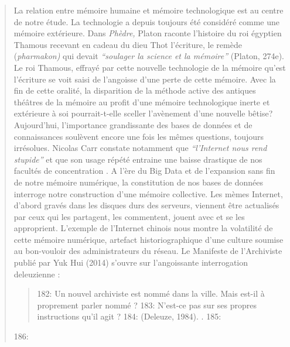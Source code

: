 \begin{quote}
La relation entre m\'emoire humaine et m\'emoire technologique est au centre de notre \'etude. La technologie a depuis toujours \'et\'e consid\'er\'e comme une m\'emoire ext\'erieure. Dans \textit{Ph\`edre, }Platon raconte l{\textquoteright}histoire du roi \'egyptien Thamous recevant en cadeau du dieu Thot l{\textquoteright}\'ecriture, le rem\`ede (\textit{pharmakon) }qui devait \textit{{\textquotedblleft}soulager la science et la m\'emoire{\textquotedblright} }(Platon, 274e). Le roi Thamous, effray\'e par cette nouvelle technologie de la m\'emoire qu{\textquoteright}est l{\textquoteright}\'ecriture se voit saisi de l{\textquoteright}angoisse d{\textquoteright}une perte de cette m\'emoire. Avec la fin de cette oralit\'e, la disparition de la m\'ethode active des antiques th\'e\^atres de la m\'emoire au profit d{\textquoteright}une m\'emoire technologique inerte et ext\'erieure \`a soi pourrait-t-elle sceller l{\textquoteright}av\`enement d{\textquoteright}une nouvelle b\^etise? Aujourd{\textquoteright}hui, l{\textquoteright}importance grandissante des bases de donn\'ees et de connaissances soul\`event encore une fois les m\^emes questions, toujours irr\'esolues. Nicolas Carr constate notamment que \textit{{\textquotedblleft}l{\textquoteright}Internet nous rend stupide{\textquotedblright}} et que son usage r\'ep\'et\'e entraine une baisse drastique de nos facult\'es de concentration \cite{Carr2010}. A l{\textquoteright}\`ere du Big Data et de l{\textquoteright}expansion sans fin de notre m\'emoire num\'erique, la constitution de nos bases de donn\'ees interroge notre construction d{\textquoteright}une m\'emoire collective. Les m\`emes Internet, d{\textquoteright}abord grav\'es dans les disques durs des serveurs, viennent \^etre actualis\'es par ceux qui les partagent, les commentent, jouent avec et se les approprient. L{\textquoteright}exemple de l{\textquoteright}Internet chinois nous montre la volatilit\'e de cette m\'emoire num\'erique, artefact historiographique d{\textquoteright}une culture soumise au bon-vouloir des administrateurs du r\'eseau. Le Manifeste de l{\textquoteright}Archiviste publi\'e par Yuk Hui (2014) s{\textquoteright}ouvre sur l{\textquoteright}angoissante interrogation deleuzienne :  \begin{quote}
182: Un nouvel archiviste est nomm\'e dans la ville. Mais est-il \`a proprement parler nomm\'e ?
183: N'est-ce pas sur ses propres instructions qu'il agit ? 
184: (Deleuze, 1984).
\cite{Deleuze1984}.
185: \end{quote}
186: 

\end{quote}
